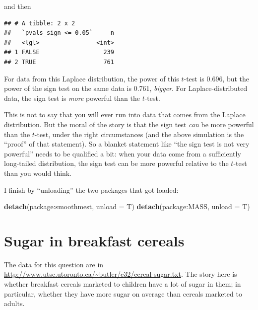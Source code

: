 \documentclass[]{tufte-book}
\newenvironment{Shaded}{}{}
\newcommand{\DataTypeTok}[1]{\textcolor[rgb]{0.56,0.13,0.00}{#1}}
\newcommand{\FloatTok}[1]{\textcolor[rgb]{0.25,0.63,0.44}{#1}}
\newcommand{\KeywordTok}[1]{\textcolor[rgb]{0.00,0.44,0.13}{\textbf{#1}}}
\newcommand{\NormalTok}[1]{#1}
\newcommand{\OperatorTok}[1]{\textcolor[rgb]{0.40,0.40,0.40}{#1}}
\newcommand{\StringTok}[1]{\textcolor[rgb]{0.25,0.44,0.63}{#1}}
\theoremstyle{definition}
\theoremstyle{definition}
\theoremstyle{definition}
\theoremstyle{remark}
\begin{document}
and then

\begin{Shaded}
\end{Shaded}

\begin{verbatim}
## # A tibble: 2 x 2
##   `pvals_sign <= 0.05`     n
##   <lgl>                <int>
## 1 FALSE                  239
## 2 TRUE                   761
\end{verbatim}

For data from this Laplace distribution, the power of this \(t\)-test is
0.696, but the power of the sign test on the same data is 0.761,
\emph{bigger}. For Laplace-distributed data, the sign test is
\emph{more} powerful than the \(t\)-test.

This is not to say that you will ever run into data that comes from the
Laplace distribution. But the moral of the story is that the sign test
\emph{can} be more powerful than the \(t\)-test, under the right
circumstances (and the above simulation is the ``proof'' of that
statement). So a blanket statement like ``the sign test is not very
powerful'' needs to be qualified a bit: when your data come from a
sufficiently long-tailed distribution, the sign test can be more
powerful relative to the \(t\)-test than you would think.

I finish by ``unloading'' the two packages that got loaded:

\begin{Shaded}
\begin{Highlighting}[]
\KeywordTok{detach}\NormalTok{(package}\OperatorTok{:}\NormalTok{smoothmest, }\DataTypeTok{unload =}\NormalTok{ T)}
\KeywordTok{detach}\NormalTok{(package}\OperatorTok{:}\NormalTok{MASS, }\DataTypeTok{unload =}\NormalTok{ T)}
\end{Highlighting}
\end{Shaded}

\hypertarget{sugar-in-breakfast-cereals}{%
\section{Sugar in breakfast cereals}\label{sugar-in-breakfast-cereals}}

The data for this question are in
\url{http://www.utsc.utoronto.ca/~butler/c32/cereal-sugar.txt}. The
story here is whether breakfast cereals marketed to children have a lot
of sugar in them; in particular, whether they have more sugar on average
than cereals marketed to adults.
\end{document}
